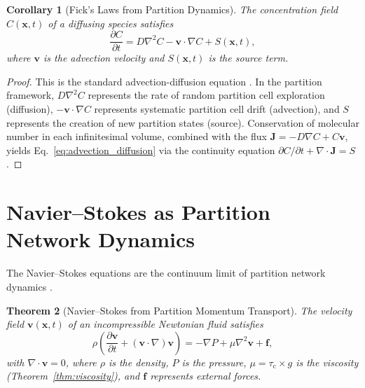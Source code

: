 \documentclass[11pt,twocolumn,a4paper]{article}
\theoremstyle{plain}
\newtheorem{theorem}{Theorem}[section]
\newtheorem{corollary}[theorem]{Corollary}
\theoremstyle{definition}
\theoremstyle{remark}
\newcommand{\tauc}{\tau_{\mathrm{c}}}
\begin{document}
\begin{corollary}[Fick's Laws from Partition Dynamics]
\label{cor:fick}
The concentration field $C(\mathbf{x}, t)$ of a diffusing species satisfies
\begin{equation}
\frac{\partial C}{\partial t} = D \nabla^2 C - \mathbf{v} \cdot \nabla C + S(\mathbf{x}, t),
\label{eq:advection_diffusion}
\end{equation}
where $\mathbf{v}$ is the advection velocity and $S(\mathbf{x}, t)$ is the source term.
\end{corollary}

\begin{proof}
This is the standard advection-diffusion equation \cite{fick1855diffusion, taylor1921diffusion}. In the partition framework, $D\nabla^2 C$ represents the rate of random partition cell exploration (diffusion), $-\mathbf{v}\cdot\nabla C$ represents systematic partition cell drift (advection), and $S$ represents the creation of new partition states (source). Conservation of molecular number in each infinitesimal volume, combined with the flux $\mathbf{J} = -D\nabla C + C\mathbf{v}$, yields Eq.~\eqref{eq:advection_diffusion} via the continuity equation $\partial C/\partial t + \nabla \cdot \mathbf{J} = S$.
\end{proof}


\section{Navier--Stokes as Partition Network Dynamics}
\label{sec:navierstokes}

The Navier--Stokes equations are the continuum limit of partition network dynamics \cite{batchelor2000introduction, landau1987fluid}.

\begin{theorem}[Navier--Stokes from Partition Momentum Transport]
\label{thm:navier_stokes}
The velocity field $\mathbf{v}(\mathbf{x}, t)$ of an incompressible Newtonian fluid satisfies
\begin{equation}
\rho\left(\frac{\partial \mathbf{v}}{\partial t} + (\mathbf{v} \cdot \nabla)\mathbf{v}\right) = -\nabla P + \mu \nabla^2 \mathbf{v} + \mathbf{f},
\label{eq:navier_stokes}
\end{equation}
with $\nabla \cdot \mathbf{v} = 0$, where $\rho$ is the density, $P$ is the pressure, $\mu = \tauc \times g$ is the viscosity (Theorem~\ref{thm:viscosity}), and $\mathbf{f}$ represents external forces.
\end{theorem}
\end{document}
